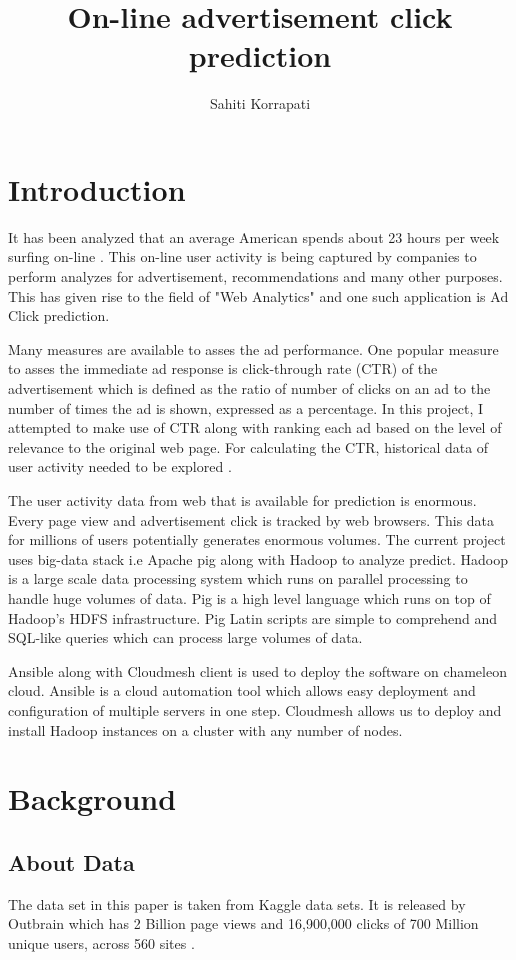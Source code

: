 \documentclass[9pt,twocolumn,twoside]{../../styles/osajnl}
\title{ On-line advertisement click prediction }
\author[1,*]{Sahiti Korrapati}
\affil[1]{School of Informatics and Computing, Bloomington, IN 47408, U.S.A.}
\affil[*]{Corresponding authors: sakorrap@iu.edu, S17-IR-2013}
\begin{document}
\maketitle
\section{Introduction}
It has been analyzed that an average American spends about 23 hours per week surfing on-line \cite{news-social-media}. This on-line user activity is being captured by companies to perform analyzes for advertisement, recommendations and many other purposes. This has given rise to the field of "Web Analytics" and one such application is Ad Click prediction.

Many measures are available to asses the ad performance. One popular measure to asses the immediate ad response is click-through rate (CTR) of the advertisement \cite{dictionary-clickThrough} which is defined as the ratio of number of clicks on an ad to the number of times the ad is shown, expressed as a percentage. In this project, I attempted to make use of CTR along with ranking each ad based on the level of relevance to the original web page. For calculating the CTR, historical data of user activity needed to be explored \cite{wiki-clickThrough}.

The user activity data from web that is available for prediction is enormous. Every page view and advertisement click is tracked by web browsers. This data for millions of users potentially generates enormous volumes. The current project uses big-data stack i.e Apache pig along with Hadoop to analyze predict. Hadoop is a large scale data processing system which runs on parallel processing to handle huge volumes of data. Pig is a high level language which runs on top of Hadoop's HDFS infrastructure. Pig Latin scripts are simple to comprehend and SQL-like queries which can process large volumes of data.

Ansible along with Cloudmesh client is used to deploy the software on chameleon cloud. Ansible is a cloud automation tool which allows easy deployment and configuration of multiple servers in one step. Cloudmesh allows us to deploy and install Hadoop instances on a cluster with any number of nodes.

\section{Background}
\subsection{About Data}
The data set in this paper is taken from Kaggle data sets. It is released by Outbrain which has 2 Billion page views and 16,900,000 clicks of 700 Million unique users, across 560 sites \cite{kaggle-outbrain}.
\end{document}
